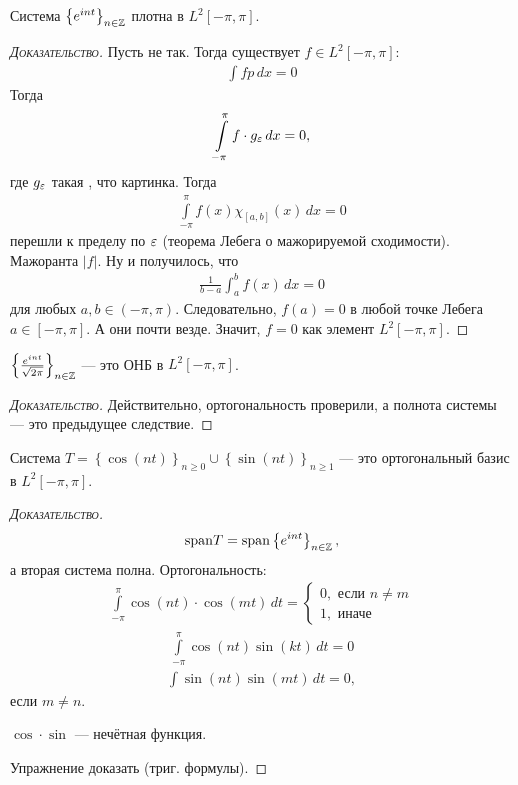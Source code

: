 \documentclass[../complex-analysis.tex]{subfiles}
\begin{document}
\begin{crly}
 Система $ \left\{e^{int}\right\}_{n \in \mathbb{Z}}  $ плотна в $ L^{2}[-\pi,\pi] $.
\end{crly}
\begin{proof}[\normalfont\textsc{Доказательство}]
 Пусть не так. Тогда существует $ f \in L^{2}[-\pi,\pi] $:
 \begin{align*}
  \int f p \,dx = 0
 \end{align*} Тогда 
 \begin{align*}
  \int\limits_{-\pi}^{\pi} f \cdot g_\varepsilon \, dx = 0,
 \end{align*} где $ g_\varepsilon $ такая , что {\color{red} картинка}. Тогда
 \begin{align*}
  \int\limits_{-\pi}^{\pi} f(x) \chi_{[a,b]}(x) \,dx = 0
 \end{align*} перешли к пределу по $ \varepsilon $ (теорема Лебега о мажорируемой сходимости). Мажоранта $ \left| f \right| $. Ну и получилось, что 
 \begin{align*}
  \frac{1}{b-a} \int_a^{b} f(x)\,dx = 0
 \end{align*} для любых $ a,  b \in(-\pi,\pi)$. Следовательно, $ f(a) = 0 $ в любой точке Лебега $ a \in [-\pi,\pi] $. А они почти везде. Значит, $ f = 0 $ как элемент $ L^{2}[-\pi,\pi] $.
\end{proof}

\begin{crly}
 $ \left\{\frac{e^{int}}{\sqrt{2\pi}}\right\}_{n \in \mathbb{Z}} $ --- это ОНБ в $ L^{2}[-\pi,\pi] $.
\end{crly}
\begin{proof}[\normalfont\textsc{Доказательство}]
 Действительно, ортогональность проверили, а полнота системы --- это предыдущее следствие.
\end{proof}

\begin{crly}
 Система $ T = \left\{\cos(nt)\right\}_{n \geqslant 0} \cup \left\{\sin(nt)\right\}_{n \geqslant 1}  $ --- это ортогональный базис в $ L^{2}[-\pi,\pi] $.
\end{crly}
\begin{proof}[\normalfont\textsc{Доказательство}]
 \begin{align*}
  \mathrm{span}T = \mathrm{span} \left\{ e^{int} \right\}_{n \in \mathbb{Z}},
 \end{align*} а вторая система полна. Ортогональность:
 \begin{align*}
  \int\limits_{-\pi}^{\pi} \cos(nt) \cdot \cos(mt) \,dt = \begin{cases}
   0, \text{ если } n \neq m \\
   1, \text{ иначе }
  \end{cases} 
 \end{align*}
 \begin{align*}
  \int\limits_{-\pi}^{\pi} \cos(nt)\sin(kt)\,dt = 0
 \end{align*}
 \begin{align*}
  \int \sin(nt)\sin(mt)\,dt = 0,
 \end{align*} если $ m \neq n $.

 $ \cos \cdot \sin $ --- нечётная функция.

 Упражнение доказать (триг. формулы).
\end{proof}
\end{document}
